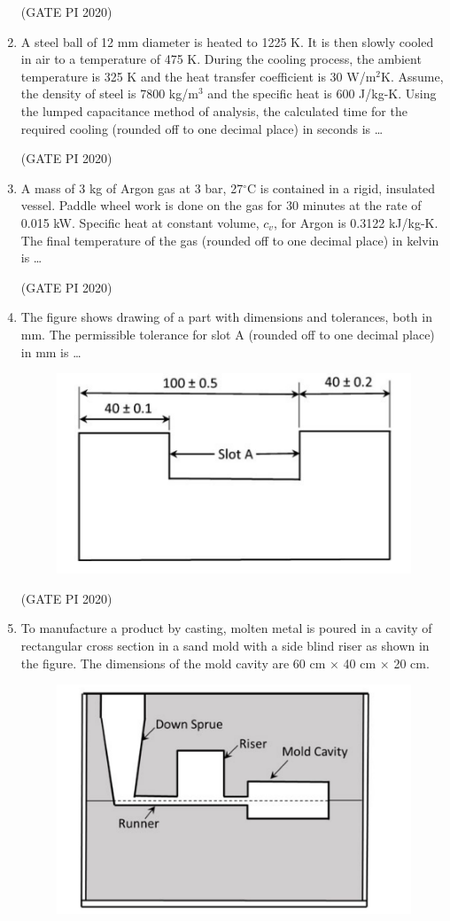 \documentclass[journal,12pt,onecolumn]{IEEEtran}
\theoremstyle{remark}
\begin{document}
\begin{enumerate}
\hfill (GATE PI 2020)

\item A steel ball of 12 mm diameter is heated to 1225 K. It is then slowly cooled in air to a temperature of 475 K. During the cooling process, the ambient temperature is 325 K and the heat transfer coefficient is 30 W/m$^2$K. Assume, the density of steel is 7800 kg/m$^3$ and the specific heat is 600 J/kg-K. Using the lumped capacitance method of analysis, the calculated time for the required cooling (rounded off to one decimal place) in seconds is \dots 

\hfill (GATE PI 2020)

\item A mass of 3 kg of Argon gas at 3 bar, 27$^\circ$C is contained in a rigid, insulated vessel. Paddle wheel work is done on the gas for 30 minutes at the rate of 0.015 kW. Specific heat at constant volume, $c_v$, for Argon is 0.3122 kJ/kg-K. The final temperature of the gas (rounded off to one decimal place) in kelvin is \dots 

\hfill (GATE PI 2020)

\item The figure shows drawing of a part with dimensions and tolerances, both in mm. The permissible tolerance for slot A (rounded off to one decimal place) in mm is \dots 
\begin{figure}[H]
    \centering
    \includegraphics[width=0.5\columnwidth]{figs/fig15.png}
    \caption{}
    \label{fig:placeholder}
\end{figure}

\hfill (GATE PI 2020)

\item To manufacture a product by casting, molten metal is poured in a cavity of rectangular cross section in a sand mold with a side blind riser as shown in the figure. The dimensions of the mold cavity are 60 cm $\times$ 40 cm $\times$ 20 cm.

\begin{figure}[H]
    \centering
    \includegraphics[width=0.5\columnwidth]{figs/fig16.png}
    \caption{}
    \label{fig:placeholder}
\end{figure}


\end{enumerate}
\end{document}

